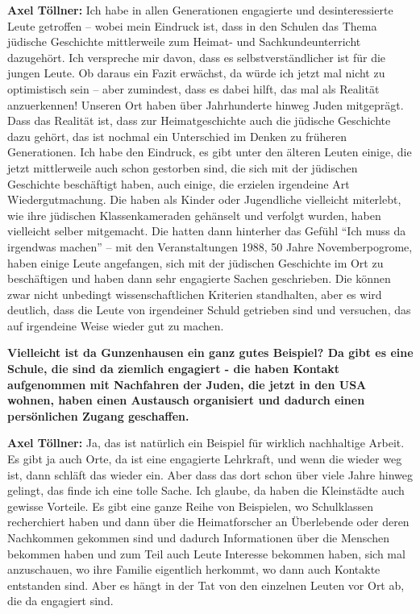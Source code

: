 \textbf{Axel Töllner:} Ich habe in allen Generationen engagierte und desinteressierte Leute getroffen – wobei mein Eindruck ist, dass in den Schulen das Thema jüdische Geschichte mittlerweile zum Heimat- und Sachkundeunterricht dazugehört. Ich verspreche mir davon, dass es selbstverständlicher ist für die jungen Leute. Ob daraus ein Fazit erwächst, da würde ich jetzt mal nicht zu optimistisch sein – aber zumindest, dass es dabei hilft, das mal als Realität anzuerkennen! Unseren Ort haben über Jahrhunderte hinweg Juden mitgeprägt. Dass das Realität ist, dass zur Heimatgeschichte auch die jüdische Geschichte dazu gehört, das ist nochmal ein Unterschied im Denken zu früheren Generationen. Ich habe den Eindruck, es gibt unter den älteren Leuten einige, die jetzt mittlerweile auch schon gestorben sind, die sich mit der jüdischen Geschichte beschäftigt haben, auch einige, die erzielen irgendeine Art Wiedergutmachung. Die haben als Kinder oder Jugendliche vielleicht miterlebt, wie ihre jüdischen Klassenkameraden gehänselt und verfolgt wurden, haben vielleicht selber mitgemacht. Die hatten dann hinterher das Gefühl "`Ich muss da irgendwas machen"' – mit den Veranstaltungen 1988, 50 Jahre Novemberpogrome, haben einige Leute angefangen, sich mit der jüdischen Geschichte im Ort zu beschäftigen und haben dann sehr engagierte Sachen geschrieben. Die können zwar nicht unbedingt wissenschaftlichen Kriterien standhalten, aber es wird deutlich, dass die Leute von irgendeiner Schuld getrieben sind und versuchen, das auf irgendeine Weise wieder gut zu machen. 

\textbf{Vielleicht ist da Gunzenhausen ein ganz gutes Beispiel? Da gibt es eine Schule, die sind da ziemlich engagiert - die haben Kontakt aufgenommen mit Nachfahren der Juden, die jetzt in den USA wohnen, haben einen Austausch organisiert und dadurch einen persönlichen Zugang geschaffen.}
 
\textbf{Axel Töllner:} Ja, das ist natürlich ein Beispiel für wirklich nachhaltige Arbeit. Es gibt ja auch Orte, da ist eine engagierte Lehrkraft, und wenn die wieder weg ist, dann schläft das wieder ein. Aber dass das dort schon über viele Jahre hinweg gelingt, das finde ich eine tolle Sache. Ich glaube, da haben die Kleinstädte auch gewisse Vorteile.  
Es gibt eine ganze Reihe von Beispielen, wo Schulklassen recherchiert haben und dann über die Heimatforscher an Überlebende oder deren Nachkommen gekommen sind und dadurch Informationen über die Menschen bekommen haben und zum Teil auch Leute Interesse bekommen haben, sich mal anzuschauen, wo ihre Familie eigentlich herkommt, wo dann auch Kontakte entstanden sind. Aber es hängt in der Tat von den einzelnen Leuten vor Ort ab, die da engagiert sind. 


